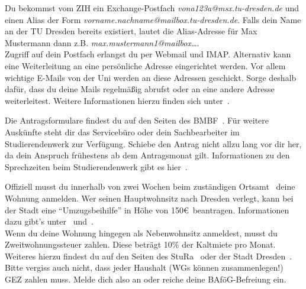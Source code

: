 \begin{itemize}[leftmargin=*]
Du bekommst vom ZIH ein Exchange-Postfach \textit{vona123a@msx.tu-dresden.de}
und einen Alias der Form \textit{vorname.nachname@mailbox.tu-dresden.de}.
Falls dein Name an der TU Dresden bereits existiert,
lautet die Alias-Adresse für Max Mustermann dann z.B.
\textit{max.mustermann1@mailbox…}. \\
Zugriff auf dein Postfach erlangst du per Webmail und IMAP\@. Alternativ kann eine
Weiterleitung an eine persönliche Adresse eingerichtet werden. Vor allem
wichtige E-Mails von der Uni werden an diese Adressen geschickt. Sorge deshalb
dafür, dass du deine Mails regelmäßig abrufst oder an eine andere Adresse
weiterleitest. Weitere Informationen hierzu finden sich unter~.

Die Antragsformulare findest du auf den Seiten des BMBF~. Für weitere
Auskünfte steht dir das Servicebüro oder dein Sachbearbeiter im
Studierendenwerk zur Verfügung. Schiebe den Antrag nicht allzu lang vor dir
her, da dein Anspruch frühestens ab dem Antragsmonat gilt. Informationen zu den
Sprechzeiten beim Studierendenwerk gibt es hier~.

Offiziell musst du innerhalb von zwei Wochen beim zuständigen Ortsamt~
deine Wohnung anmelden. Wer seinen Hauptwohnsitz nach Dresden verlegt, kann bei
der Stadt eine \enquote{Umzugsbeihilfe} in Höhe von 150\euro\ beantragen.
Informationen dazu gibt's unter~ und~. \\
Wenn du deine Wohnung hingegen als Nebenwohnsitz anmeldest, musst du
Zweitwohnungssteuer zahlen. Diese beträgt 10\% der Kaltmiete pro Monat.
Weiteres hierzu findest du auf den Seiten des StuRa~ oder der Stadt
Dresden~.
Bitte vergiss auch nicht, dass jeder Haushalt (WGs können zusammenlegen!) GEZ
zahlen muss. Melde dich also an oder reiche deine BAföG-Befreiung ein.


\end{itemize}
